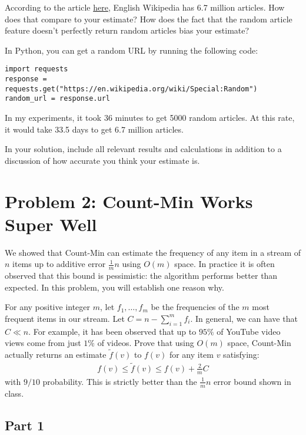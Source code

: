 \documentclass{article}
\begin{document}
According to the article \href{https://en.wikipedia.org/wiki/English_Wikipedia}{here}, English Wikipedia has 6.7 million articles. How does that compare to your estimate? How does the fact that the random article feature doesn't perfectly return random articles bias your estimate?

In Python, you can get a random URL by running the following code:

\begin{verbatim}
import requests
response = requests.get("https://en.wikipedia.org/wiki/Special:Random")
random_url = response.url	
\end{verbatim}

In my experiments, it took 36 minutes to get 5000 random articles. At this rate, it would take 33.5 days to get 6.7 million articles.

In your solution, include all relevant results and calculations in addition to a discussion of how accurate you think your estimate is.

%

\section*{Problem 2: Count-Min Works Super Well}

We showed that Count-Min can estimate the frequency of any item in a stream of $n$ items up to additive error $\frac{1}{m} n$ using $O(m)$ space. In practice it is often observed that this bound is pessimistic: the algorithm performs better than expected. In this problem, you will establish one reason why. 

For any positive integer $m$, let $f_1, \ldots, f_{m}$ be the frequencies of the $m$ most frequent items in our stream. Let $C = n - \sum_{i=1}^{m} f_i$. In general, we can have that $C \ll n$. For example, it has been observed that up to $95\%$ of YouTube video views come from just $1\%$ of videos. 
Prove that using $O(m)$ space,  Count-Min actually returns an estimate $\tilde{f}(v)$ to $f(v)$ for any item $v$ satisfying:
\begin{align}\label{eq:improved_frequency_bound}
	f(v) \leq \tilde{f}(v) \leq f(v) + \frac{2}{m} C
\end{align}
with $9/10$ probability. This is strictly better than the $\frac{1}{m} n$ error bound shown in class. 

\subsection*{Part 1}
\end{document}
